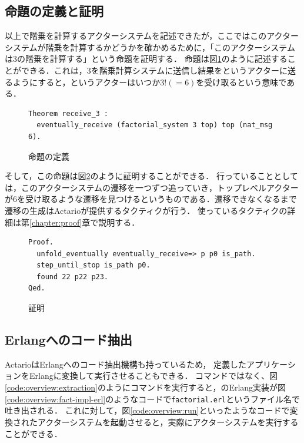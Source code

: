 \subsection{命題の定義と証明}

以上で階乗を計算するアクターシステムを記述できたが，ここではこのアクターシステムが階乗を計算するかどうかを確かめるために，「このアクターシステムは3の階乗を計算する」という命題を証明する．
命題は図\ref{code:overview:fact-spec}のように記述することができる．これは，$3$を階乗計算システムに送信し結果をというアクターに送るようにすると，というアクターはいつか$3! (= 6)$を受け取るという意味である．

\begin{figure}[tp]
\begin{lstlisting}
Theorem receive_3 :
  eventually_receive (factorial_system 3 top) top (nat_msg 6).
\end{lstlisting}
\caption{命題の定義}\label{code:overview:fact-spec}
\end{figure}

そして，この命題は図\ref{code:overview:fact-proof}のように証明することができる．
行っていることとしては，このアクターシステムの遷移を一つずつ追っていき，トップレベルアクターが$6$を受け取るような遷移を見つけるというものである．遷移できなくなるまで遷移の生成はActarioが提供するタクティクが行う．
使っているタクティクの詳細は第\ref{chapter:proof}章で説明する．

\begin{figure}[tp]
\begin{lstlisting}
Proof.
  unfold_eventually eventually_receive=> p p0 is_path.
  step_until_stop is_path p0.
  found 22 p22 p23.
Qed.
\end{lstlisting}
  \caption{証明}\label{code:overview:fact-proof}
\end{figure}


\subsection{Erlangへのコード抽出}

ActarioはErlangへのコード抽出機構も持っているため，
定義したアプリケーションをErlangに変換して実行させることもできる．
コマンドではなく、図\ref{code:overview:extraction}のようにコマンドを実行すると，のErlang実装が図\ref{code:overview:fact-impl-erl}のようなコードで\texttt{factorial.erl}というファイル名で吐き出される．
これに対して，図\ref{code:overview:run}といったようなコードで変換されたアクターシステムを起動させると，実際にアクターシステムを実行することができる．

